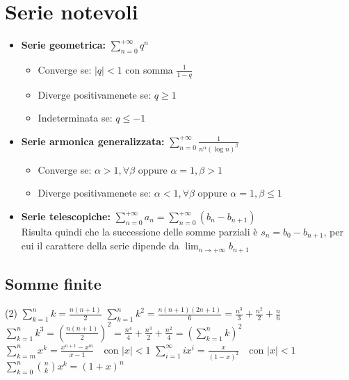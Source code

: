 \section{Serie notevoli}
\begin{itemize}
    \item \textbf{Serie geometrica:} $\sum_{n=0}^{+\infty}q^n$
    \begin{itemize}
        \item Converge se: $|q|<1$ con somma $\frac{1}{1-q}$
        \item Diverge positivamenete se: $q\geq 1$
        \item Indeterminata se:  $q\leq -1$
    \end{itemize}
    \item \textbf{Serie armonica generalizzata:} $\sum_{n=0}^{+\infty}\frac{1}{n^\alpha(\log n)^\beta}$
    \begin{itemize}
        \item Converge se: $\alpha>1, \forall \beta$ oppure $\alpha =1, \beta >1$
        \item Diverge positivamenete se: $\alpha< 1, \forall \beta$ oppure $\alpha =1, \beta \leq 1$
    \end{itemize}
    \item \textbf{Serie telescopiche:} $\sum_{n=0}^{+\infty}a_n=\sum_{n=0}^{+\infty}(b_n-b_{n+1})$\\
    Risulta quindi che la successione delle somme parziali è $s_n=b_0-b_{n+1}$, per cui il carattere della serie dipende da $\lim_{n\to+\infty}b_{n+1}$
\end{itemize}
\subsection{Somme finite}
\everymath{\displaystyle}
\begin{tasks}[label=\textbullet](2)
    \task $\sum_{k=1}^n k = \frac{n(n+1)}{2}$
    \task $\sum_{k=1}^n k^2 = \frac{n(n+1)(2n+1)}{6} = \frac{n^3}{3} + \frac{n^2}{2} + \frac{n}{6}  $
    \task $\sum_{k=1}^n k^3 = \left(\frac{n(n+1)}{2}\right)^2 = \frac{n^4}{4} + \frac{n^3}{2} + \frac{n^2}{4} = \left(\sum_{k=1}^n k\right)^2$
    \task $\sum_{k=m}^n x^k=\frac{x^{n+1}-x^m}{x-1} \quad\text{con } |x|< 1$
    \task $\sum_{i=1}^\infty i x^i = \frac{x}{(1-x)^2}\quad\text{con } |x|< 1$
    \task $ \sum_{k=0}^n \binom{n}{k} x^{k} = (1+x)^{n} $
\end{tasks}
